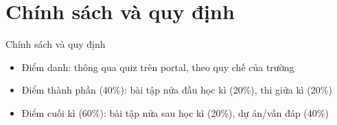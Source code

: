 \documentclass{beamer}
\begin{document}
\section{Chính sách và quy định}

\begin{frame}{Chính sách và quy định}
    \begin{itemize}
        \item Điểm danh: thông qua quiz trên portal, theo quy chế của trường
        \item Điểm thành phần (40\%): bài tập nửa đầu học kì (20\%), thi giữa kì (20\%) 
        \item Điểm cuối kì (60\%): bài tập nửa sau học kì (20\%), dự án/vấn đáp (40\%)
    \end{itemize}
\end{frame}






\end{document}
